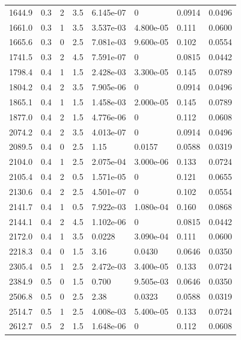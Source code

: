 \documentclass[preview]{standalone}
\begin{document}
{{{\begin{tabular}{L{1.2cm}C{1.2cm} C{0.3cm}C{0.5cm} C{1.4cm}C{1.4cm} C{1.4cm}C{1.4cm}}
  1644.9  &   0.3  & 2     & 3.5 &  6.145e-07  & 0  & 0.0914 &  0.0496   \\ 
  1661.0  &   0.3  & 1     & 3.5 &  3.537e-03  & 4.800e-05  & 0.111 &  0.0600   \\ 
  1665.6  &   0.3  & 0     & 2.5 &  7.081e-03  & 9.600e-05  & 0.102 &  0.0554   \\ 
  1741.5  &   0.3  & 2     & 4.5 &  7.591e-07  & 0  & 0.0815 &  0.0442   \\ 
  1798.4  &   0.4  & 1     & 1.5 &  2.428e-03  & 3.300e-05  & 0.145 &  0.0789   \\ 
  1804.2  &   0.4  & 2     & 3.5 &  7.905e-06  & 0  & 0.0914 &  0.0496   \\ 
  1865.1  &   0.4  & 1     & 1.5 &  1.458e-03  & 2.000e-05  & 0.145 &  0.0789   \\ 
  1877.0  &   0.4  & 2     & 1.5 &  4.776e-06  & 0  & 0.112 &  0.0608   \\ 
  2074.2  &   0.4  & 2     & 3.5 &  4.013e-07  & 0  & 0.0914 &  0.0496   \\ 
  2089.5  &   0.4  & 0     & 2.5 &  1.15  & 0.0157  & 0.0588 &  0.0319   \\ 
  2104.0  &   0.4  & 1     & 2.5 &  2.075e-04  & 3.000e-06  & 0.133 &  0.0724   \\ 
  2105.4  &   0.4  & 2     & 0.5 &  1.571e-05  & 0  & 0.121 &  0.0655   \\ 
  2130.6  &   0.4  & 2     & 2.5 &  4.501e-07  & 0  & 0.102 &  0.0554   \\ 
  2141.7  &   0.4  & 1     & 0.5 &  7.922e-03  & 1.080e-04  & 0.160 &  0.0868   \\ 
  2144.1  &   0.4  & 2     & 4.5 &  1.102e-06  & 0  & 0.0815 &  0.0442   \\ 
  2172.0  &   0.4  & 1     & 3.5 &  0.0228  & 3.090e-04  & 0.111 &  0.0600   \\ 
  2218.3  &   0.4  & 0     & 1.5 &  3.16  & 0.0430  & 0.0646 &  0.0350   \\ 
  2305.4  &   0.5  & 1     & 2.5 &  2.472e-03  & 3.400e-05  & 0.133 &  0.0724   \\ 
  2384.9  &   0.5  & 0     & 1.5 &  0.700  & 9.505e-03  & 0.0646 &  0.0350   \\ 
  2506.8  &   0.5  & 0     & 2.5 &  2.38  & 0.0323  & 0.0588 &  0.0319   \\ 
  2514.7  &   0.5  & 1     & 2.5 &  4.008e-03  & 5.400e-05  & 0.133 &  0.0724   \\ 
  2612.7  &   0.5  & 2     & 1.5 &  1.648e-06  & 0  & 0.112 &  0.0608   \\ 

\end{tabular}}}}
\end{document}
